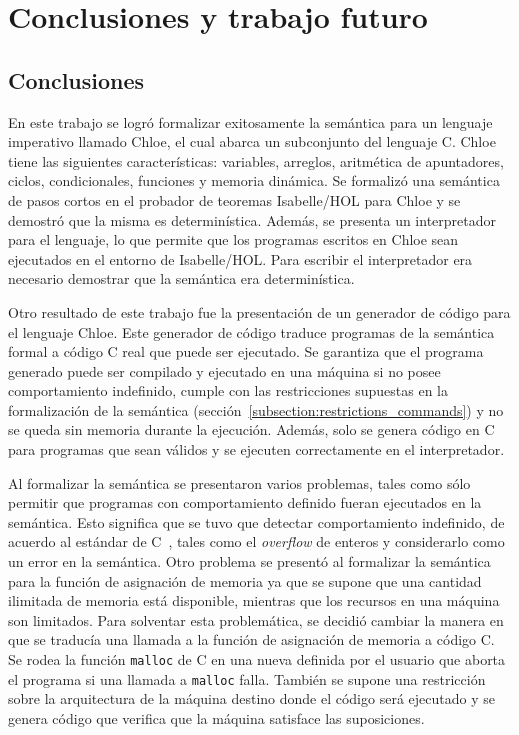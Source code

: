 \chapter{Conclusiones y trabajo futuro}\label{chapter:conclusion}

\section{Conclusiones}

En este trabajo se logró formalizar exitosamente la semántica para un lenguaje imperativo llamado Chloe, el cual abarca un subconjunto del lenguaje C.
Chloe tiene las siguientes características: variables, arreglos, aritmética de apuntadores, ciclos, condicionales, funciones y memoria dinámica.
Se formalizó una semántica de pasos cortos en el probador de teoremas Isabelle/HOL para Chloe y se demostró que la misma es determinística.
Además, se presenta un interpretador para el lenguaje, lo que permite que los programas escritos en Chloe sean ejecutados en el entorno de Isabelle/HOL.
Para escribir el interpretador era necesario demostrar que la semántica era determinística.

Otro resultado de este trabajo fue la presentación de un generador de código para el lenguaje Chloe.
Este generador de código traduce programas de la semántica formal a código C real que puede ser ejecutado.
Se garantiza que el programa generado puede ser compilado y ejecutado en una máquina si no posee comportamiento indefinido, cumple con las restricciones supuestas en la formalización de la semántica (sección~\ref{subsection:restrictions_commands}) y no se queda sin memoria durante la ejecución.
Además, solo se genera código en C para programas que sean válidos y se ejecuten correctamente en el interpretador.

Al formalizar la semántica se presentaron varios problemas, tales como sólo permitir que programas con comportamiento definido fueran ejecutados en la semántica.
Esto significa que se tuvo que detectar comportamiento indefinido, de acuerdo al estándar de C~\cite{c99}, tales como el \textit{overflow} de enteros y considerarlo como un error en la semántica.
Otro problema se presentó al formalizar la semántica para la función de asignación de memoria ya que se supone que una cantidad ilimitada de memoria está disponible, mientras que los recursos en una máquina son limitados.
Para solventar esta problemática, se decidió cambiar la manera en que se traducía una llamada a la función de asignación de memoria a código C.
Se rodea la función \verb|malloc| de C en una nueva definida por el usuario que aborta el programa si una llamada a \verb|malloc| falla.
También se supone una restricción sobre la arquitectura de la máquina destino donde el código será ejecutado y se genera código que verifica que la máquina satisface las suposiciones.


